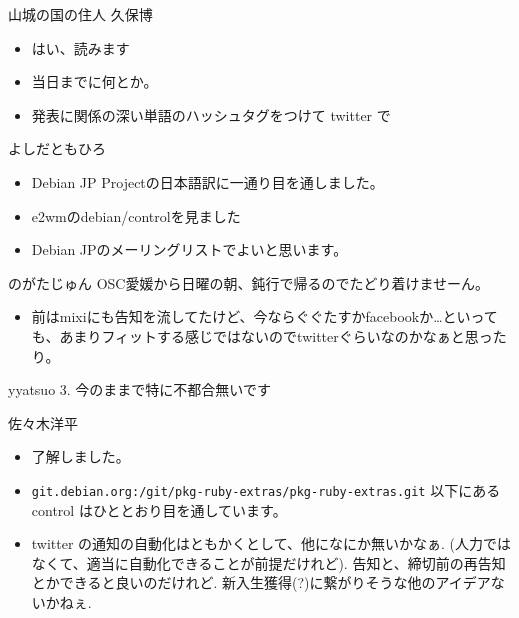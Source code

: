 \documentclass[mingoth,a4paper]{jsarticle}
\begin{document}
\begin{prework}{ 山城の国の住人 久保博 }
  \begin{itemize}
  \item はい、読みます
  \item 当日までに何とか。
  \item 発表に関係の深い単語のハッシュタグをつけて twitter で
  \end{itemize}
\end{prework}

\begin{prework}{ よしだともひろ }
  \begin{itemize}
  \item Debian JP Projectの日本語訳に一通り目を通しました。
  \item e2wmのdebian/controlを見ました
  \item Debian JPのメーリングリストでよいと思います。
  \end{itemize}
\end{prework}

\begin{prework}{ のがたじゅん }
  OSC愛媛から日曜の朝、鈍行で帰るのでたどり着けませーん。
  \begin{itemize}
  \item 前はmixiにも告知を流してたけど、今ならぐぐたすかfacebookか…といっても、あまりフィットする感じではないのでtwitterぐらいなのかなぁと思ったり。
  \end{itemize}
\end{prework}

\begin{prework}{ yyatsuo }
  3. 今のままで特に不都合無いです
\end{prework}

\begin{prework}{ 佐々木洋平 }
  \begin{itemize}
  \item 了解しました。
  \item {\tt{git.debian.org:/git/pkg-ruby-extras/pkg-ruby-extras.git}}
    以下にある control はひととおり目を通しています。
  \item twitter の通知の自動化はともかくとして、他になにか無いかなぁ.
    (人力ではなくて、適当に自動化できることが前提だけれど). 告知と、締切前の再告知とかできると良いのだけれど.
    新入生獲得(?)に繋がりそうな他のアイデアないかねぇ.
  \end{itemize}
\end{prework}

\clearpage
\end{document}
